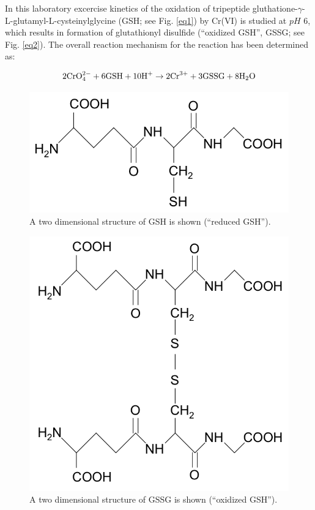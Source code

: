 \documentclass[byrevtex,amssymb,aps,pra,floatfix,letterpaper]{revtex4}
\begin{document}
\noindent
In this laboratory excercise kinetics of the oxidation of tripeptide gluthatione-$\gamma$-L-glutamyl-L-cysteinylglycine (GSH; see Fig. \ref{eq1}) by Cr(VI) is studied at $pH$ 6, which results in formation of glutathionyl disulfide (``oxidized GSH'', GSSG; see Fig. \ref{eq2}). The overall reaction mechanism for the reaction has been determined as:

\begin{equation}
\label{eq2}
2\textnormal{CrO}_4^{2-} + 6\textnormal{GSH} + 10\textnormal{H}^+ \rightarrow 2\textnormal{Cr}^{3+} + 3\textnormal{GSSG} + 8\textnormal{H}_2\textnormal{O}
\end{equation}

\begin{figure}[!htp]
\begin{center}
\includegraphics[scale=0.3]{fig1}
\caption{A two dimensional structure of GSH is shown (``reduced GSH'').}
\label{fig1}
\end{center}
\end{figure}

\begin{figure}[!htp]
\begin{center}
\includegraphics[scale=0.3]{fig2}
\caption{A two dimensional structure of GSSG is shown (``oxidized GSH'').}
\label{fig2}
\end{center}
\end{figure}
\end{document}

